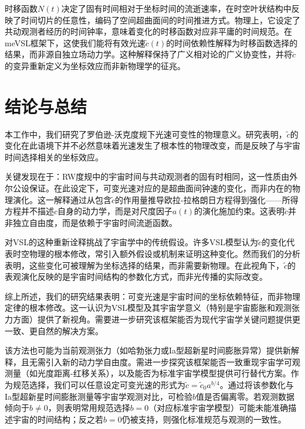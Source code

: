 \documentclass[jkps,preprint,fleqn]{revtex4}
\newcommand{\tc}{\tilde{c}}
\begin{document}
\begin{CJK*}{UTF8}{gbsn}
时移函数$N(t)$决定了固有时间相对于坐标时间的流逝速率，在时空叶状结构中反映了时间切片的任意性，编码了空间超曲面间的时间推进方式。物理上，它设定了共动观测者经历的时间钟率，意味着变化的时移函数对应非平庸的时间规范。在meVSL框架下，这使我们能将有效光速$\tc(t)$的时间依赖性解释为时移函数选择的结果，而非源自独立场动力学。这种解释保持了广义相对论的广义协变性，并将$\tc$的变异重新定义为坐标效应而非新物理学的征兆。
\section{结论与总结}\label{sec:Conc}
本工作中，我们研究了罗伯逊-沃克度规下光速可变性的物理意义。研究表明，$\tc$的变化在此语境下并不必然意味着光速发生了根本性的物理改变，而是反映了与宇宙时间选择相关的坐标效应。

关键发现在于：RW度规中的宇宙时间与共动观测者的固有时相同，这一性质由外尔公设保证。在此设定下，可变光速对应的是超曲面间钟速的变化，而非内在的物理演化。这一解释通过从包含$\tc$的作用量推导欧拉-拉格朗日方程得到强化——所得方程并不描述$c$自身的动力学，而是对尺度因子$a(t)$的演化施加约束。这表明$\tc$并非独立自由度，而是依赖于宇宙时间流逝函数。

对VSL的这种重新诠释挑战了宇宙学中的传统假设。许多VSL模型认为$\tc$的变化代表时空物理的根本修改，常引入额外假设或机制来证明这种变化。然而我们的分析表明，这些变化可被理解为坐标选择的结果，而非需要新物理。在此视角下，$\tc$的表观演化反映的是宇宙时间结构的参数化方式，而非光传播的实际改变。

综上所述，我们的研究结果表明：可变光速是宇宙时间的坐标依赖特征，而非物理定律的根本修改。这一认识为VSL模型及其宇宙学意义（特别是宇宙膨胀和观测张力方面）提供了新视角。需要进一步研究该框架能否为现代宇宙学关键问题提供更一致、更自然的解决方案。

该方法也可能为当前观测张力（如哈勃张力或Ia型超新星时间膨胀异常）提供新解释，且无需引入新的动力学自由度。需进一步探究该框架能否一致重现宇宙学可观测量（如光度距离-红移关系），以及能否为标准宇宙学模型提供可行替代方案。作为规范选择，我们可以任意设定可变光速的形式为$\tc = \tc_0 a^{b/4}$。通过将该参数化与Ia型超新星时间膨胀测量等宇宙学观测对比，可检验$b$值是否偏离零。若观测数据倾向于$b \neq 0$，则表明常用规范选择$b = 0$（对应标准宇宙学模型）可能未能准确描述宇宙的时间结构；反之若$b = 0$仍被支持，则强化标准规范与观测的一致性。


\end{CJK*}
\end{document}
